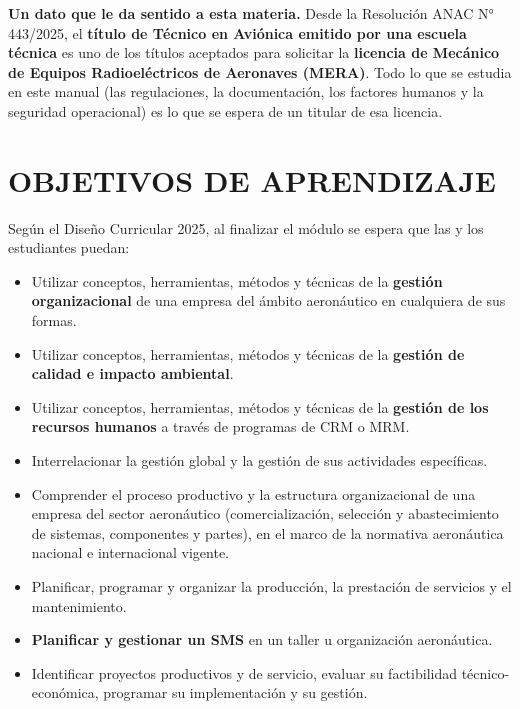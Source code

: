 \begin{recuadro}
\textbf{Un dato que le da sentido a esta materia.} Desde la Resolución ANAC N° 443/2025, el
\textbf{título de Técnico en Aviónica emitido por una escuela técnica} es uno de los títulos
aceptados para solicitar la \textbf{licencia de Mecánico de Equipos Radioeléctricos de Aeronaves
(MERA)}. Todo lo que se estudia en este manual (las regulaciones, la documentación, los factores
humanos y la seguridad operacional) es lo que se espera de un titular de esa licencia.
\end{recuadro}

\section*{OBJETIVOS DE APRENDIZAJE}
Según el Diseño Curricular 2025, al finalizar el módulo se espera que las y los estudiantes
puedan:
\begin{itemize}
  \item Utilizar conceptos, herramientas, métodos y técnicas de la \textbf{gestión
        organizacional} de una empresa del ámbito aeronáutico en cualquiera de sus formas.
  \item Utilizar conceptos, herramientas, métodos y técnicas de la \textbf{gestión de calidad e
        impacto ambiental}.
  \item Utilizar conceptos, herramientas, métodos y técnicas de la \textbf{gestión de los
        recursos humanos} a través de programas de CRM o MRM.
  \item Interrelacionar la gestión global y la gestión de sus actividades específicas.
  \item Comprender el proceso productivo y la estructura organizacional de una empresa del sector
        aeronáutico (comercialización, selección y abastecimiento de sistemas, componentes y
        partes), en el marco de la normativa aeronáutica nacional e internacional vigente.
  \item Planificar, programar y organizar la producción, la prestación de servicios y el
        mantenimiento.
  \item \textbf{Planificar y gestionar un SMS} en un taller u organización aeronáutica.
  \item Identificar proyectos productivos y de servicio, evaluar su factibilidad
        técnico-económica, programar su implementación y su gestión.
\end{itemize}

